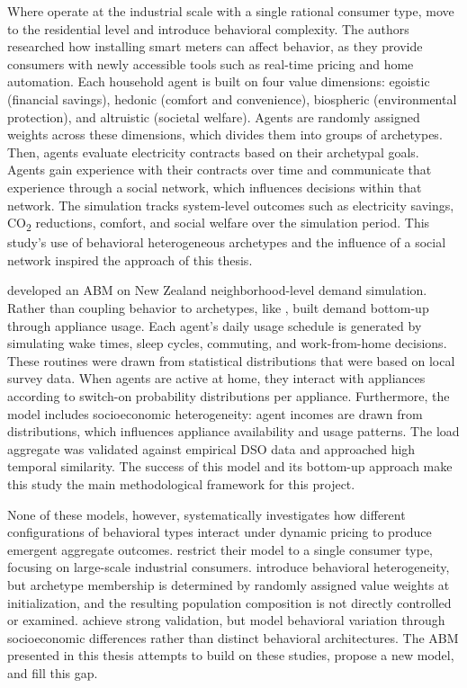 \documentclass[11pt, a4paper]{article}
\begin{document}
\pagebreak

Where \textcite{fatras_agent-based_2022} operate at the industrial scale with a single rational consumer type, \textcite{vasiljevska_agent-based_2017} move to the residential level and introduce behavioral complexity. The authors researched how installing smart meters can affect behavior, as they provide consumers with newly accessible tools such as real-time pricing and home automation. Each household agent is built on four value dimensions: egoistic (financial savings), hedonic (comfort and convenience), biospheric (environmental protection), and altruistic (societal welfare). Agents are randomly assigned weights across these dimensions, which divides them into groups of archetypes. Then, agents evaluate electricity contracts based on their archetypal goals. Agents gain experience with their contracts over time and communicate that experience through a social network, which influences decisions within that network. The simulation tracks system-level outcomes such as electricity savings, CO\textsubscript{2} reductions, comfort, and social welfare over the simulation period. This study's use of behavioral heterogeneous archetypes and the influence of a social network inspired the approach of this thesis.

\textcite{williams_residential_2025} developed an ABM on New Zealand neighborhood-level demand simulation. Rather than coupling behavior to archetypes, like \textcite{vasiljevska_agent-based_2017}, \textcite{williams_residential_2025} built demand bottom-up through appliance usage. Each agent's daily usage schedule is generated by simulating wake times, sleep cycles, commuting, and work-from-home decisions. These routines were drawn from statistical distributions that were based on local survey data. When agents are active at home, they interact with appliances according to switch-on probability distributions per appliance. Furthermore, the model includes socioeconomic heterogeneity: agent incomes are drawn from distributions, which influences appliance availability and usage patterns. The load aggregate was validated against empirical DSO data and approached high temporal similarity. The success of this model and its bottom-up approach make this study the main methodological framework for this project.

None of these models, however, systematically investigates how different configurations of behavioral types interact under dynamic pricing to produce emergent aggregate outcomes. \textcite{fatras_agent-based_2022} restrict their model to a single consumer type, focusing on large-scale industrial consumers. \textcite{vasiljevska_agent-based_2017} introduce behavioral heterogeneity, but archetype membership is determined by randomly assigned value weights at initialization, and the resulting population composition is not directly controlled or examined. \textcite{williams_residential_2025} achieve strong validation, but model behavioral variation through socioeconomic differences rather than distinct behavioral architectures. The ABM presented in this thesis attempts to build on these studies, propose a new model, and fill this gap. 
\end{document}
